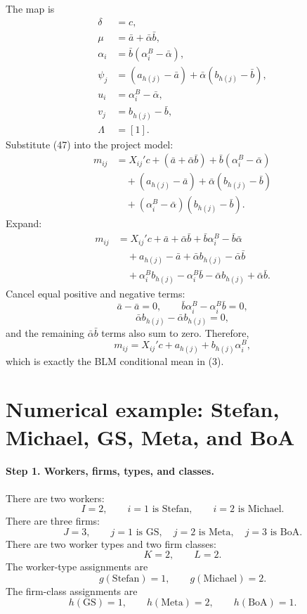 \documentclass[11pt]{article}
\begin{document}
The map is
\[
\begin{aligned}
\delta&=c,\\
\mu&=\bar a+\bar\alpha\bar b,\\
\alpha_i&=\bar b(\alpha_i^B-\bar\alpha),\\
\psi_j&=(a_{h(j)}-\bar a)
       +\bar\alpha(b_{h(j)}-\bar b),\\
u_i&=\alpha_i^B-\bar\alpha,\\
v_j&=b_{h(j)}-\bar b,\\
\Lambda&=[1].
\end{aligned}
\tag{47}
\]
Substitute (47) into the project model:
\begin{align*}
m_{ij}
&=
X_{ij}'c
+
(\bar a+\bar\alpha\bar b)
+
\bar b(\alpha_i^B-\bar\alpha)\\
&\quad+
(a_{h(j)}-\bar a)
+
\bar\alpha(b_{h(j)}-\bar b)\\
&\quad+
(\alpha_i^B-\bar\alpha)(b_{h(j)}-\bar b).
\end{align*}
Expand:
\begin{align*}
m_{ij}
&=
X_{ij}'c
+
\bar a+\bar\alpha\bar b
+
\bar b\alpha_i^B-\bar b\bar\alpha\\
&\quad+
a_{h(j)}-\bar a
+
\bar\alpha b_{h(j)}-\bar\alpha\bar b\\
&\quad+
\alpha_i^Bb_{h(j)}
-
\alpha_i^B\bar b
-
\bar\alpha b_{h(j)}
+
\bar\alpha\bar b.
\end{align*}
Cancel equal positive and negative terms:
\[
\bar a-\bar a=0,
\qquad
\bar b\alpha_i^B-\alpha_i^B\bar b=0,
\]
\[
\bar\alpha b_{h(j)}-\bar\alpha b_{h(j)}=0,
\]
and the remaining \(\bar\alpha\bar b\) terms also sum to zero.  Therefore,
\[
m_{ij}
=
X_{ij}'c+a_{h(j)}+b_{h(j)}\alpha_i^B,

\]
which is exactly the BLM conditional mean in (3).

\section*{Numerical example: Stefan, Michael, GS, Meta, and BoA}

\paragraph{Step 1. Workers, firms, types, and classes.}

There are two workers:
\[
I=2,
\qquad
i=1\text{ is Stefan},
\qquad
i=2\text{ is Michael}.
\]
There are three firms:
\[
J=3,
\qquad
j=1\text{ is GS},
\quad
j=2\text{ is Meta},
\quad
j=3\text{ is BoA}.
\]
There are two worker types and two firm classes:
\[
K=2,
\qquad
L=2.
\]
The worker-type assignments are
\[
g(\text{Stefan})=1,
\qquad
g(\text{Michael})=2.
\tag{48}
\]
The firm-class assignments are
\[
h(\text{GS})=1,
\qquad
h(\text{Meta})=2,
\qquad
h(\text{BoA})=1.
\tag{49}
\]
\end{document}
